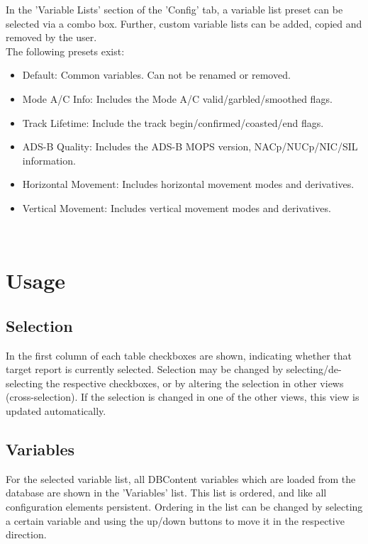 In the 'Variable Lists' section of the 'Config' tab, a variable list preset can be selected via a combo box. 
Further, custom variable lists can be added, copied and removed by the user. \\

The following presets exist:

\begin{itemize}
\item Default: Common variables. Can not be renamed or removed.
\item Mode A/C Info: Includes the Mode A/C valid/garbled/smoothed flags.
\item Track Lifetime: Include the track begin/confirmed/coasted/end flags.
\item ADS-B Quality: Includes the ADS-B MOPS version, NACp/NUCp/NIC/SIL information.
\item Horizontal Movement: Includes horizontal movement modes and derivatives.
\item Vertical Movement: Includes vertical movement modes and derivatives.
\end{itemize}
\ \\

\section{Usage}

\subsection{Selection}

In the first column of each table checkboxes are shown, indicating whether that target report is currently selected. 
Selection may be changed by selecting/de-selecting the respective checkboxes, or by altering the selection in other views (cross-selection). 
If the selection is changed in one of the other views, this view is updated automatically.

\subsection{Variables}

For the selected variable list, all DBContent variables which are loaded from the database are shown in the 'Variables' list. 
This list is ordered, and like all configuration elements persistent. 
Ordering in the list can be changed by selecting a certain variable and using the up/down buttons to move it in the respective direction. \\

